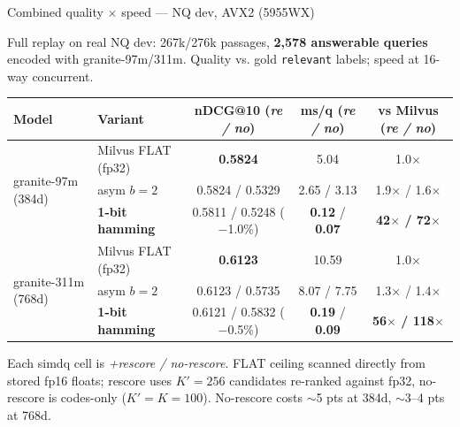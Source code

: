 \documentclass[aspectratio=169,12pt]{beamer}
\begin{document}
\begin{frame}{Combined quality $\times$ speed --- NQ dev, AVX2 (5955WX)}

{\scriptsize Full replay on real NQ dev: 267k/276k passages, \textbf{2{,}578 answerable queries}
encoded with granite-97m/311m. Quality vs. gold \texttt{relevant} labels;
speed at 16-way concurrent.}

\vspace{1pt}
\begin{center}\scriptsize
\renewcommand{\arraystretch}{0.95}
\begin{tabular}{l l c c c}
\toprule
Model & Variant & nDCG@10 (\emph{re / no}) & ms/q (\emph{re / no}) & vs Milvus (\emph{re / no}) \\
\midrule
\multirow{3}{*}{granite-97m \scriptsize(384d)}
  & Milvus FLAT (fp32)         & \textbf{0.5824}                 & 5.04                                                    & 1.0$\times$ \\
  & asym $b{=}2$                & 0.5824 / 0.5329                 & 2.65 / 3.13                                             & 1.9$\times$ / 1.6$\times$ \\
  & \textbf{1-bit hamming}     & 0.5811 / 0.5248 \tiny($-$1.0\%) & \textbf{\textcolor{key}{0.12}} / \textbf{\textcolor{key}{0.07}} & \textbf{\textcolor{key}{42$\times$ / 72$\times$}} \\
\midrule
\multirow{3}{*}{granite-311m \scriptsize(768d)}
  & Milvus FLAT (fp32)         & \textbf{0.6123}                 & 10.59                                                   & 1.0$\times$ \\
  & asym $b{=}2$                & 0.6123 / 0.5735                 & 8.07 / 7.75                                             & 1.3$\times$ / 1.4$\times$ \\
  & \textbf{1-bit hamming}     & 0.6121 / 0.5832 \tiny($-$0.5\%) & \textbf{\textcolor{key}{0.19}} / \textbf{\textcolor{key}{0.09}} & \textbf{\textcolor{key}{56$\times$ / 118$\times$}} \\
\bottomrule
\end{tabular}
\end{center}

\vspace{2pt}
{\scriptsize Each simdq cell is \emph{+rescore / no-rescore}. FLAT ceiling scanned directly from stored fp16 floats;
rescore uses $K'{=}256$ candidates re-ranked against fp32, no-rescore is codes-only ($K'{=}K{=}100$).
No-rescore costs $\sim$5 pts at 384d, $\sim$3--4 pts at 768d.}

\vspace{2pt}

\end{frame}
\end{document}
